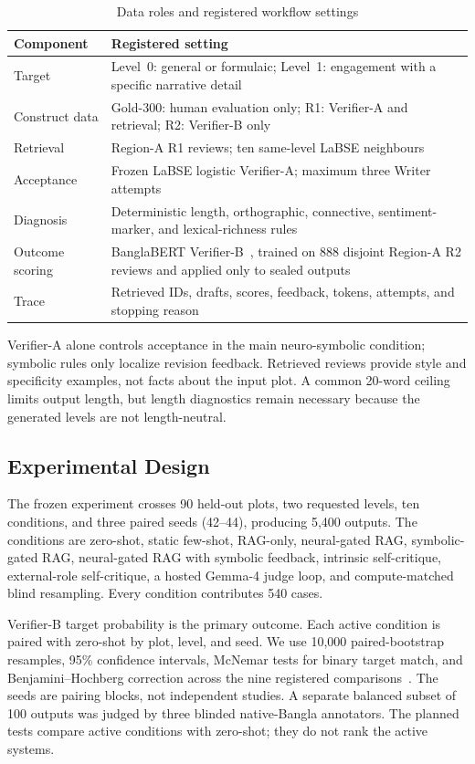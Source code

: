 \begin{table}[t]
\centering
\caption{Data roles and registered workflow settings}
\label{tab:workflow-settings}
\footnotesize
\setlength{\tabcolsep}{3.5pt}
\renewcommand{\arraystretch}{1.04}
\begin{tabularx}{\columnwidth}{@{}
  >{\raggedright\arraybackslash}p{}
  >{\raggedright\arraybackslash}X@{}}
\toprule
\textbf{Component} & \textbf{Registered setting} \\
\midrule
Target & Level~0: general or formulaic; Level~1: engagement with a specific narrative detail \\
Construct data & Gold-300: human evaluation only; R1: Verifier-A and retrieval; R2: Verifier-B only \\
Retrieval & 886 Region-A R1 reviews; ten same-level LaBSE neighbours~\cite{b8} \\
Acceptance & Frozen LaBSE logistic Verifier-A; maximum three Writer attempts \\
Diagnosis & Deterministic length, orthographic, connective, sentiment-marker, and lexical-richness rules \\
Outcome scoring & BanglaBERT Verifier-B~\cite{b2}, trained on 888 disjoint Region-A R2 reviews and applied only to sealed outputs \\
Trace & Retrieved IDs, drafts, scores, feedback, tokens, attempts, and stopping reason \\
\bottomrule
\end{tabularx}
\end{table}

Verifier-A alone controls acceptance in the main neuro-symbolic condition; symbolic rules only localize revision feedback. Retrieved reviews provide style and specificity examples, not facts about the input plot. A common 20-word ceiling limits output length, but length diagnostics remain necessary because the generated levels are not length-neutral.

\subsection{Experimental Design}

The frozen experiment crosses 90 held-out plots, two requested levels, ten conditions, and three paired seeds (42--44), producing 5,400 outputs. The conditions are zero-shot, static few-shot, RAG-only, neural-gated RAG, symbolic-gated RAG, neural-gated RAG with symbolic feedback, intrinsic self-critique, external-role self-critique, a hosted Gemma-4 judge loop, and compute-matched blind resampling. Every condition contributes 540 cases.

Verifier-B target probability is the primary outcome. Each active condition is paired with zero-shot by plot, level, and seed. We use 10,000 paired-bootstrap resamples, 95\% confidence intervals, McNemar tests for binary target match, and Benjamini--Hochberg correction across the nine registered comparisons~\cite{b49,b50}. The seeds are pairing blocks, not independent studies. A separate balanced subset of 100 outputs was judged by three blinded native-Bangla annotators. The planned tests compare active conditions with zero-shot; they do not rank the active systems.
